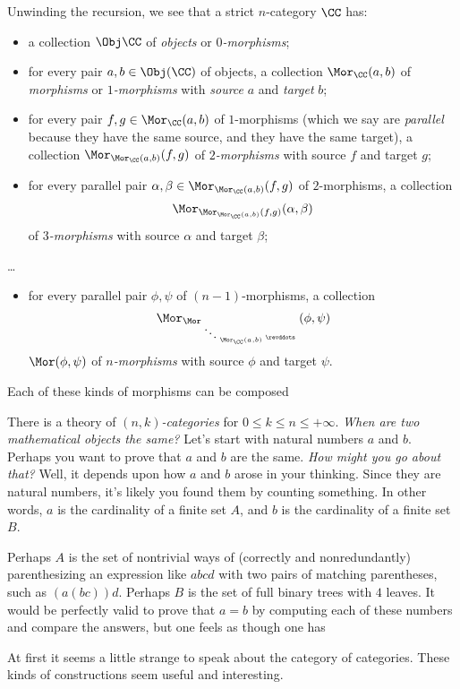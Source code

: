 Unwinding the recursion, we see that a strict $n$-category $\CC$ has:
\begin{itemize}
  \item a collection $\Obj \CC$ of \emph{objects} or \emph{$0$-morphisms};
  \item for every pair $a,b \in \Obj(\CC)$ of objects, a collection $\Mor_{\CC}(a,b)$ of \emph{morphisms} or \emph{$1$-morphisms} with \emph{source} $a$ and \emph{target} $b$;
  \item for every pair $f,g \in \Mor_{\CC}(a,b)$ of $1$-morphisms (which we say are \emph{parallel} because they have the same source, and they have the same target), a collection $\Mor_{\Mor_{\CC}(a,b)}(f,g)$ of \emph{$2$-morphisms} with source $f$ and target $g$;
  \item for every parallel pair $\alpha,\beta \in \Mor_{\Mor_{\CC}(a,b)}(f,g)$ of $2$-morphisms, a collection
    \[
      \Mor_{\Mor_{\Mor_{\CC}(a,b)}(f,g)}(\alpha,\beta)
    \]
    of \emph{$3$-morphisms} with source $\alpha$ and target $\beta$;
\end{itemize}

\dots

\begin{itemize}
  \item for every parallel pair $\phi, \psi$ of $(n-1)$-morphisms, a collection
    \[
    \Mor_{\Mor_{\;{\ddots}_{\;\Mor_{\CC}(a,b)\;}{\revddots}\;}}(\phi,\psi)
    \]
    $\Mor(\phi,\psi)$ of \emph{$n$-morphisms} with source $\phi$ and target $\psi$.
\end{itemize} 
Each of these kinds of morphisms can be composed 


There is a theory of \emph{$(n,k)$-categories} for $0 \leq k \leq n \leq +\infty$.
\emph{When are two mathematical objects the same?}
Let's start with natural numbers $a$ and $b$.
Perhaps you want to prove that $a$ and $b$ are the same.
\emph{How might you go about that?}
Well, it depends upon how $a$ and $b$ arose in your thinking.
Since they are natural numbers, it's likely you found them by counting something.
In other words, $a$ is the cardinality of a finite set $A$, and
$b$ is the cardinality of a finite set $B$.

Perhaps $A$ is the set of nontrivial ways of (correctly and nonredundantly) parenthesizing an expression like $abcd$ with two pairs of matching parentheses,
such as $(a(bc))d$.
Perhaps $B$ is the set of full binary trees with $4$ leaves.
It would be perfectly valid to prove that $a=b$ by computing each of these numbers and compare the answers, but
one feels as though one has 

At first it seems a little strange to speak about the category of categories.
These kinds of constructions seem useful and interesting.
